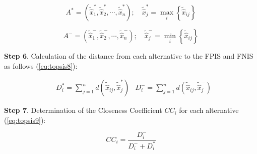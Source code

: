 \begin{equation}
A^{*}=\left(\widetilde{\widehat{x}}_{1}^{*}, \widetilde{\widehat{x}}_{2}^{*}, \cdots, \widetilde{\widehat{x}}_{n}^{*}\right); \quad \widetilde{\widehat{x}}_{j}^{*}=\max _{i}\left\{\widetilde{\widehat{x}}_{i j}\right\}
\label{eq:topsis6}
\end{equation}

\begin{equation}
A^{-}=\left(\widetilde{\widehat{x}}_{1}^{-}, \widetilde{\widehat{x}}_{2}^{-}, \cdots, \widetilde{\widehat{x}}_{n}^{-}\right); \quad  \widetilde{\widehat{x}}_{j}^{-}=\min _{i}\left\{\widetilde{\widehat{x}}_{i j}\right\}
\label{eq:topsis7}
\end{equation}

\noindent \textbf{Step 6}. Calculation of the distance from each alternative to the FPIS and FNIS as follows (\ref{eq:topsis8}):

\begin{equation}
\begin{aligned}
& D_{i}^{*}=\sum_{j=1}^{n} d\left(\widetilde{\widehat{x}}_{i j}, \widetilde{\widehat{x}}_{j}^{*}\right) 
& D_{i}^{-}=\sum_{j=1}^{n} d\left(\widetilde{\widehat{x}}_{i j}, \widetilde{\widehat{x}}_{j}^{-}\right)
\end{aligned}
\label{eq:topsis8}
\end{equation}

\noindent \textbf{Step 7}. Determination of the Closeness Coefficient $CC_{i}$ for each alternative (\ref{eq:topsis9}):

\begin{equation}
C C_{i}=\frac{D_{i}^{-}}{D_{i}^{-}+D_{i}^{*}}
\label{eq:topsis9}
\end{equation}